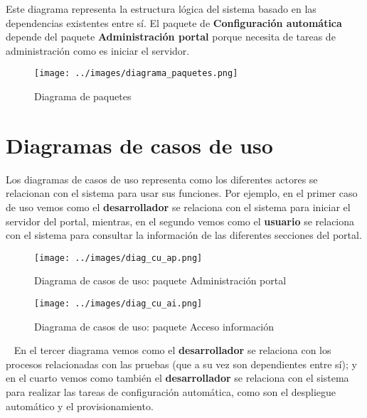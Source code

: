 Este diagrama representa la estructura lógica del sistema basado en las dependencias existentes entre sí. El paquete de \textbf{Configuración automática} depende del paquete \textbf{Administración portal} porque necesita de tareas de administración como es iniciar el servidor.

\begin{figure}[!ht]
  \begin{center}
  \texttt{[image: ../images/diagrama\_paquetes.png]}
  \caption{Diagrama de paquetes}
  \label{fig:diag_paquetes}
  \end{center}
\end{figure}
 
\section{Diagramas de casos de uso}

Los diagramas de casos de uso representa como los diferentes actores se relacionan con el sistema para usar sus funciones. Por ejemplo, en el primer caso de uso vemos como el \textbf{desarrollador} se relaciona con el sistema para iniciar el servidor del portal, mientras, en el segundo vemos como el \textbf{usuario} se relaciona con el sistema para consultar la información de las diferentes secciones del portal.

\begin{figure}[!ht]
  \begin{center}
  \texttt{[image: ../images/diag\_cu\_ap.png]}
  \caption{Diagrama de casos de uso: paquete Administración portal}
  \label{fig:diag_cu_ap}
  \end{center}
\end{figure}

\begin{figure}[!ht]
  \begin{center}
  \texttt{[image: ../images/diag\_cu\_ai.png]}
  \caption{Diagrama de casos de uso: paquete Acceso información}
  \label{fig:diag_cu_ai}
  \end{center}
\end{figure}

\newpage
\
\newpage
En el tercer diagrama vemos como el \textbf{desarrollador} se relaciona con los procesos relacionadas con las pruebas (que a su vez son dependientes entre sí); y en el cuarto vemos como también el \textbf{desarrollador} se relaciona con el sistema para realizar las tareas de configuración automática, como son el despliegue automático y el provisionamiento.

